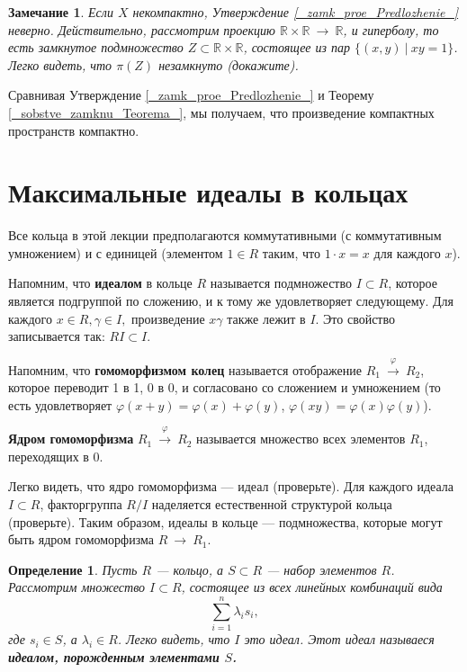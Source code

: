 \documentclass[12pt]{book}
\newcommand{\arrow}{{\:\longrightarrow\:}}
\renewcommand{\phi}{\varphi}
\def\R{{\mathbb R}}
\theoremstyle{upshape}
\newtheorem{zadacha}{Задача}[chapter]
\theoremstyle{generic}
\newtheorem{opredelenie}[teorema]{Определение}
\newtheorem{remark}[teorema]{Замечание}
\def\замечание{\begin{remark}}
\def\еза{\end{remark}}
\theoremstyle{upshapenonumber}
\newcommand{\следствие}{%
     \refstepcounter{teorema}
     {\noindent\bf Следствие \thechapter.\arabic{teorema}:\ }}
\newcommand{\пример}{%
     \refstepcounter{teorema}
     {\noindent\bf Пример \thechapter.\arabic{teorema}:\ }}
\newcommand{\лемма}{%
     \refstepcounter{teorema}
     {\noindent\bf Лемма \thechapter.\arabic{teorema}:\ }}
\newcommand{\теорема}{%
     \refstepcounter{teorema}
     {\noindent\bf Теорема \thechapter.\arabic{teorema}:\ }}
\newcommand{\утверждение}{%
     \refstepcounter{teorema}
     {\noindent\bf Утверждение \thechapter.\arabic{teorema}:\ }}
\def\бф{\bf}
\def\ем{\em}
\def\задача{\begin{zadacha}}
\def\ез{\end{zadacha}}
\def\еу{\end{ukazanie}}
\def\определение{\begin{opredelenie}}
\def\ео{\end{opredelenie}}
\def\енум{\begin{enumerate}}
\def\ее{\end{enumerate}}
\begin{document}
\hfill

\замечание 
Если $X$ некомпактно, Утверждение \ref{_zamk_proe_Predlozhenie_}
неверно. Действительно, рассмотрим проекцию $\R \times \R
\arrow \R$, и гиперболу, то есть замкнутое подмножество 
$Z\subset \R \times \R$, состоящее из пар $\{ (x,y) \ |\ xy=1\}$.
Легко видеть, что $\pi(Z)$ незамкнуто (докажите).
\еза


\hfill

Сравнивая Утверждение \ref{_zamk_proe_Predlozhenie_}
и Теорему \ref{_sobstve_zamknu_Teorema_}, мы получаем,
что произведение компактных пространств компактно.


\section{Максимальные идеалы в кольцах}


Все кольца в этой лекции предполагаются коммутативными
(с коммутативным умножением) и с единицей (элементом
$1\in R$ таким, что $1\cdot x =x $ для каждого $x$).

Напомним, что {\бф идеалом} в кольце $R$ называется
подмножество $I\subset R$, которое является подгруппой
по сложению, и к тому же удовлетворяет следующему.
Для каждого $x\in R, \gamma\in I,$ произведение 
$x\gamma$ также лежит в $I$. Это свойство
записывается так: $RI \subset I$.

Напомним, что {\бф гомоморфизмом колец}
называется отображение $R_1\stackrel \phi \arrow R_2$, которое
переводит 1 в 1, 0 в 0, и согласовано со сложением и умножением
(то есть удовлетворяет $\phi(x+y) = \phi(x) + \phi(y)$,
$\phi(xy) = \phi(x) \phi(y)$).

{\бф Ядром гомоморфизма} $R_1\stackrel \phi \arrow R_2$
называется множество всех элементов $R_1$, переходящих в 0.

Легко видеть, что ядро гомоморфизма --- идеал (проверьте).
Для каждого идеала $I \subset R$, факторгруппа $R/I$
наделяется естественной структурой кольца (проверьте).
Таким образом, идеалы в кольце --- подмножества, которые
могут быть ядром гомоморфизма $R \arrow R_1$.


\определение
Пусть $R$ --- кольцо, а $S\subset R$ --- набор элементов
$R$. Рассмотрим множество $I\subset R$, состоящее
из всех линейных комбинаций вида 
\[
\sum_{i=1}^n \lambda_i s_i,
\]
где $s_i \in S$, а $\lambda_i \in R$.
Легко видеть, что $I$ это идеал.
Этот идеал называеся {\бф идеалом,
порожденным элементами $S$.}
\ео
\end{document}
